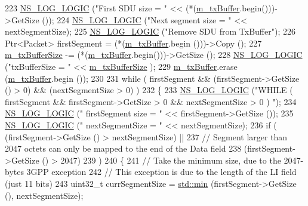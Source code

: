 \begin{DoxyCode}
223   \hyperlink{group__logging_ga88acd260151caf2db9c0fc84997f45ce}{NS\_LOG\_LOGIC} (\textcolor{stringliteral}{"First SDU size    = "} << (*(\hyperlink{classns3_1_1LteRlcUmLowLat_aaeef0eed7788f26d7564a84a0c546f74}{m\_txBuffer}.begin()))->GetSize ());
224   \hyperlink{group__logging_ga88acd260151caf2db9c0fc84997f45ce}{NS\_LOG\_LOGIC} (\textcolor{stringliteral}{"Next segment size = "} << nextSegmentSize);
225   \hyperlink{group__logging_ga88acd260151caf2db9c0fc84997f45ce}{NS\_LOG\_LOGIC} (\textcolor{stringliteral}{"Remove SDU from TxBuffer"});
226   Ptr<Packet> firstSegment = (*(\hyperlink{classns3_1_1LteRlcUmLowLat_aaeef0eed7788f26d7564a84a0c546f74}{m\_txBuffer}.begin ()))->Copy ();
227   \hyperlink{classns3_1_1LteRlcUmLowLat_a730b3933118b7d511e4aedab828e07aa}{m\_txBufferSize} -= (*(\hyperlink{classns3_1_1LteRlcUmLowLat_aaeef0eed7788f26d7564a84a0c546f74}{m\_txBuffer}.begin()))->GetSize ();
228   \hyperlink{group__logging_ga88acd260151caf2db9c0fc84997f45ce}{NS\_LOG\_LOGIC} (\textcolor{stringliteral}{"txBufferSize      = "} << \hyperlink{classns3_1_1LteRlcUmLowLat_a730b3933118b7d511e4aedab828e07aa}{m\_txBufferSize} );
229   \hyperlink{classns3_1_1LteRlcUmLowLat_aaeef0eed7788f26d7564a84a0c546f74}{m\_txBuffer}.erase (\hyperlink{classns3_1_1LteRlcUmLowLat_aaeef0eed7788f26d7564a84a0c546f74}{m\_txBuffer}.begin ());
230 
231   \textcolor{keywordflow}{while} ( firstSegment && (firstSegment->GetSize () > 0) && (nextSegmentSize > 0) )
232     \{
233       \hyperlink{group__logging_ga88acd260151caf2db9c0fc84997f45ce}{NS\_LOG\_LOGIC} (\textcolor{stringliteral}{"WHILE ( firstSegment && firstSegment->GetSize > 0 && nextSegmentSize > 0 )
      "});
234       \hyperlink{group__logging_ga88acd260151caf2db9c0fc84997f45ce}{NS\_LOG\_LOGIC} (\textcolor{stringliteral}{"    firstSegment size = "} << firstSegment->GetSize ());
235       \hyperlink{group__logging_ga88acd260151caf2db9c0fc84997f45ce}{NS\_LOG\_LOGIC} (\textcolor{stringliteral}{"    nextSegmentSize   = "} << nextSegmentSize);
236       \textcolor{keywordflow}{if} ( (firstSegment->GetSize () > nextSegmentSize) ||
237            \textcolor{comment}{// Segment larger than 2047 octets can only be mapped to the end of the Data field}
238            (firstSegment->GetSize () > 2047)
239          )
240         \{
241           \textcolor{comment}{// Take the minimum size, due to the 2047-bytes 3GPP exception}
242           \textcolor{comment}{// This exception is due to the length of the LI field (just 11 bits)}
243           uint32\_t currSegmentSize = \hyperlink{80211b_8c_ac6afabdc09a49a433ee19d8a9486056d}{std::min} (firstSegment->GetSize (), nextSegmentSize);

\end{DoxyCode}
